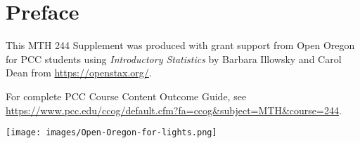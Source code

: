 \chapter{Preface}

This MTH 244 Supplement was produced with grant support from 
Open Oregon 
for PCC students using 
\emph{Introductory Statistics} 
by Barbara Illowsky and Carol Dean
from
\url{https://openstax.org/}.

For complete PCC Course Content Outcome Guide, see \url{https://www.pcc.edu/ccog/default.cfm?fa=ccog&subject=MTH&course=244}.

\begin{center}
\texttt{[image: images/Open-Oregon-for-lights.png]}
\end{center}
